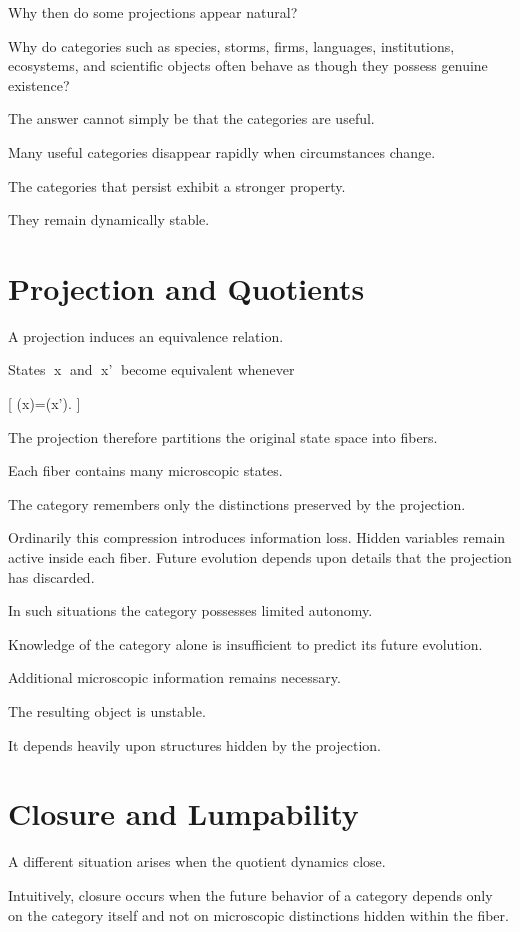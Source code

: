 \documentclass[11pt,oneside,openany]{book}
\begin{document}
Why then do some projections appear natural?

Why do categories such as species, storms, firms, languages, institutions, ecosystems, and scientific objects often behave as though they possess genuine existence?

The answer cannot simply be that the categories are useful.

Many useful categories disappear rapidly when circumstances change.

The categories that persist exhibit a stronger property.

They remain dynamically stable.

\section{Projection and Quotients}

A projection induces an equivalence relation.

States x and x' become equivalent whenever

[
\pi(x)=\pi(x').
]

The projection therefore partitions the original state space into fibers.

Each fiber contains many microscopic states.

The category remembers only the distinctions preserved by the projection.

Ordinarily this compression introduces information loss. Hidden variables remain active inside each fiber. Future evolution depends upon details that the projection has discarded.

In such situations the category possesses limited autonomy.

Knowledge of the category alone is insufficient to predict its future evolution.

Additional microscopic information remains necessary.

The resulting object is unstable.

It depends heavily upon structures hidden by the projection.

\section{Closure and Lumpability}

A different situation arises when the quotient dynamics close.

Intuitively, closure occurs when the future behavior of a category depends only on the category itself and not on microscopic distinctions hidden within the fiber.
\end{document}
